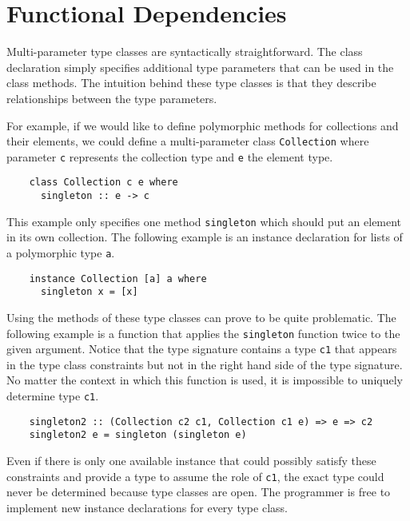 \section{Functional Dependencies}
\label{sec:functional-dependencies}
Multi-parameter type classes are syntactically straightforward. The class
declaration simply specifies additional type parameters that can be used
in the class methods. The intuition behind these type classes is that they
describe relationships between the type parameters.

For example, if we would like to define polymorphic methods for collections and their
elements, we could define a multi-parameter class \texttt{Collection} where
parameter \texttt{c} represents the collection type and \texttt{e} the
element type.
\begin{verbatim}
    class Collection c e where
      singleton :: e -> c
\end{verbatim}
This example only specifies one method \texttt{singleton} which
should put an element in its own collection.
The following example is an instance declaration for lists of a polymorphic type
\texttt{a}.
\begin{verbatim}
    instance Collection [a] a where
      singleton x = [x]
\end{verbatim}

Using the methods of these type classes can prove to be quite problematic. The
following example is a function that applies the \texttt{singleton} function
twice to the given argument. Notice that the type signature contains a type
\texttt{c1} that appears in the type class constraints but not in the right hand
side of the type signature. No matter the context in which this function is
used, it is impossible to uniquely determine type \texttt{c1}.

\begin{verbatim}
    singleton2 :: (Collection c2 c1, Collection c1 e) => e => c2
    singleton2 e = singleton (singleton e)
\end{verbatim}

Even if there is only one available instance that could possibly satisfy these
constraints and provide a type to assume the role of \texttt{c1}, the exact
type could never be determined because type classes are open. The programmer
is free to implement new instance declarations for every type class.

